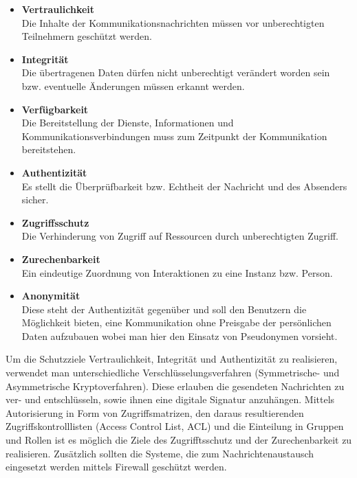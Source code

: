 \documentclass[a4paper]{scrartcl}
\begin{document}
	\begin{itemize}
	
		\item \textbf{Vertraulichkeit} \\ 
		Die Inhalte der Kommunikationsnachrichten müssen vor unberechtigten Teilnehmern geschützt werden.
		
		\item \textbf{Integrität} \\ 
		Die übertragenen Daten dürfen nicht unberechtigt verändert worden sein bzw. eventuelle Änderungen müssen erkannt werden.
		
		\item \textbf{Verfügbarkeit} \\
		Die Bereitstellung der Dienste, Informationen und Kommunikationsverbindungen muss zum Zeitpunkt der Kommunikation bereitstehen.
		
		\item \textbf{Authentizität} \\
		Es stellt die Überprüfbarkeit bzw. Echtheit der Nachricht und des Absenders sicher.
		
		\item \textbf{Zugriffsschutz} \\
		Die Verhinderung von Zugriff auf Ressourcen durch unberechtigten Zugriff.
		
		\item \textbf{Zurechenbarkeit} \\
		Ein eindeutige Zuordnung von Interaktionen zu eine Instanz bzw. Person.
		
		\item \textbf{Anonymität} \\
		Diese steht der Authentizität gegenüber und soll den Benutzern die Möglichkeit bieten, eine Kommunikation ohne Preisgabe der persönlichen Daten aufzubauen wobei man hier den Einsatz von Pseudonymen vorsieht. 
	\end{itemize}
Um die Schutzziele Vertraulichkeit, Integrität und Authentizität zu realisieren, verwendet man  unterschiedliche Verschlüsselungsverfahren (Symmetrische- und Asymmetrische Kryptoverfahren). Diese erlauben die gesendeten Nachrichten zu ver- und entschlüsseln, sowie ihnen eine digitale Signatur anzuhängen. Mittels Autorisierung in Form von Zugriffsmatrizen, den daraus resultierenden Zugriffskontrolllisten (Access Control List, ACL) und die Einteilung in Gruppen und Rollen ist es möglich die Ziele des Zugrifftsschutz und der Zurechenbarkeit zu realisieren. Zusätzlich sollten die Systeme, die zum Nachrichtenaustausch eingesetzt werden mittels Firewall geschützt werden.
\end{document}
